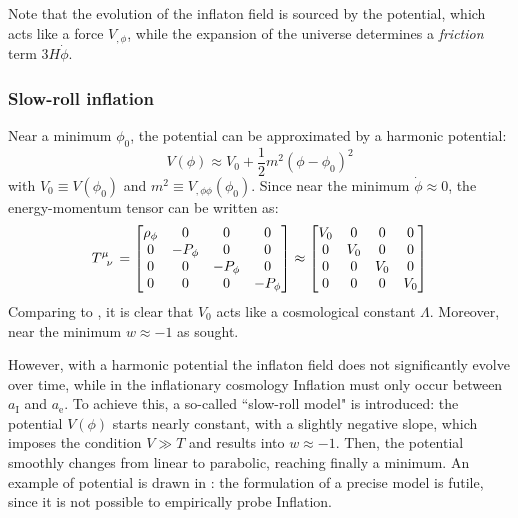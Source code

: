 Note that the evolution of the inflaton field is sourced by the potential, which acts like a force $ V_{,\phi} $, while the expansion of the universe determines a \emph{friction} term $ 3 H \dot{\phi} $.


\subsubsection{Slow-roll inflation}

Near a minimum $ \phi_0 $, the potential can be approximated by a harmonic potential:
\begin{equation*}
  V(\phi) \approx V_0 + \frac{1}{2} m^2 (\phi - \phi_0)^2
\end{equation*}
with $ V_0 \equiv V(\phi_0) $ and $ m^2 \equiv V_{,\phi\phi}(\phi_0) $. Since near the minimum $ \dot{\phi} \approx 0 $, the energy-momentum tensor can be written as:
\begin{equation*}
  \tensor{T}{^\mu_\nu} =
  \begin{bmatrix}
    \rho_\phi & 0 & 0 & 0 \\
    0 & -P_\phi & 0 & 0 \\
    0 & 0 & -P_\phi & 0 \\
    0 & 0 & 0 & -P_\phi
  \end{bmatrix}
  \approx
  \begin{bmatrix}
    V_0 & 0 & 0 & 0 \\
    0 & V_0 & 0 & 0 \\
    0 & 0 & V_0 & 0 \\
    0 & 0 & 0 & V_0
  \end{bmatrix}
\end{equation*}
Comparing to , it is clear that $ V_0 $ acts like a cosmological constant $ \Lambda $. Moreover, near the minimum $ w \approx -1 $ as sought.

However, with a harmonic potential the inflaton field does not significantly evolve over time, while in the inflationary cosmology Inflation must only occur between $ a_\text{I} $ and $ a_\text{e} $. To achieve this, a so-called ``slow-roll model" is introduced: the potential $ V(\phi) $ starts nearly constant, with a slightly negative slope, which imposes the condition $ V \gg T $ and results into $ w \approx -1 $. Then, the potential smoothly changes from linear to parabolic, reaching finally a minimum. An example of potential is drawn in : the formulation of a precise model is futile, since it is not possible to empirically probe Inflation.

